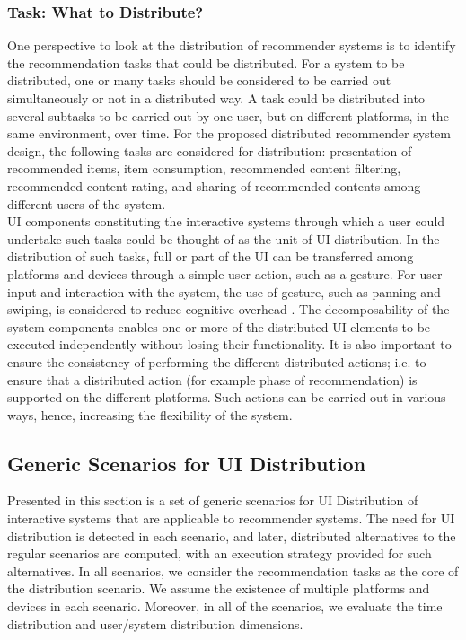 \subsubsection{Task: What to Distribute?} 
One perspective to look at the distribution of recommender systems is to
identify the recommendation tasks that could be distributed. For a system to be distributed, one or many tasks should be considered to be carried out simultaneously or not in a distributed way. A task could be distributed into several subtasks to be carried out by one user, but on different platforms, in the same environment, over time.
For the proposed distributed recommender system design, the following tasks are
considered for distribution: presentation of recommended items, item
consumption, recommended content filtering, recommended content rating, and
sharing of recommended contents among different users of the system.\\
UI components constituting the interactive systems through which a user could
undertake such tasks could be thought of as the unit of UI distribution. In the
distribution of such tasks, full or part of the UI can be transferred among
platforms and devices through a simple user action, such as a gesture. For user
input and interaction with the system, the use of gesture, such as panning and
swiping, is considered to reduce cognitive overhead \cite{woerndl2012combining}.
The decomposability of the system components enables one or more of the distributed UI elements to be executed independently without losing their functionality.
It is also important to ensure the consistency of performing the different distributed actions; i.e. to ensure that a distributed action (for example phase of recommendation) is supported on the different platforms.
Such actions can be carried out in various ways, hence, increasing the flexibility of the system.

\subsection{Generic Scenarios for UI Distribution}
Presented in this section is a set of generic scenarios for UI Distribution of
interactive systems that are applicable to recommender systems. The need for UI
distribution is detected in each scenario, and later, distributed alternatives to the regular scenarios are computed, with an execution strategy provided for such alternatives. In all scenarios, we consider the recommendation tasks as the core of the distribution scenario. We assume the existence of multiple platforms and devices in each scenario. Moreover, in all of the scenarios, we evaluate the time distribution and user/system distribution dimensions.
  
